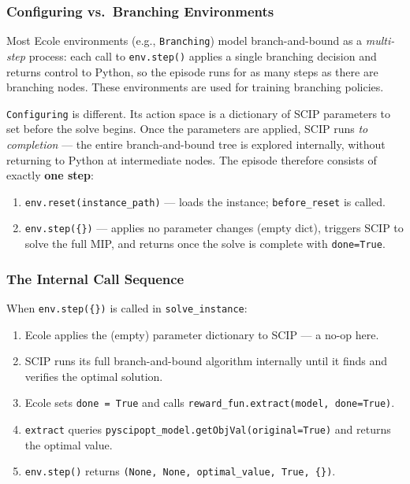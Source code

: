 \subsubsection{Configuring vs.\ Branching Environments}

Most Ecole environments (e.g., \texttt{Branching}) model branch-and-bound as a \emph{multi-step} process: each call to \texttt{env.step()} applies a single branching decision and returns control to Python, so the episode runs for as many steps as there are branching nodes. These environments are used for training branching policies.

\texttt{Configuring} is different. Its action space is a dictionary of SCIP parameters to set before the solve begins. Once the parameters are applied, SCIP runs \emph{to completion} --- the entire branch-and-bound tree is explored internally, without returning to Python at intermediate nodes. The episode therefore consists of exactly \textbf{one step}:

\begin{enumerate}
    \item \texttt{env.reset(instance\_path)} --- loads the instance; \texttt{before\_reset} is called.
    \item \texttt{env.step(\{\})} --- applies no parameter changes (empty dict), triggers SCIP to solve the full MIP, and returns once the solve is complete with \texttt{done=True}.
\end{enumerate}

\subsubsection{The Internal Call Sequence}

When \texttt{env.step(\{\})} is called in \texttt{solve\_instance}:

\begin{enumerate}
    \item Ecole applies the (empty) parameter dictionary to SCIP --- a no-op here.
    \item SCIP runs its full branch-and-bound algorithm internally until it finds and verifies the optimal solution.
    \item Ecole sets \texttt{done = True} and calls \texttt{reward\_fun.extract(model, done=True)}.
    \item \texttt{extract} queries \texttt{pyscipopt\_model.getObjVal(original=True)} and returns the optimal value.
    \item \texttt{env.step()} returns \texttt{(None, None, optimal\_value, True, \{\})}.
\end{enumerate}

